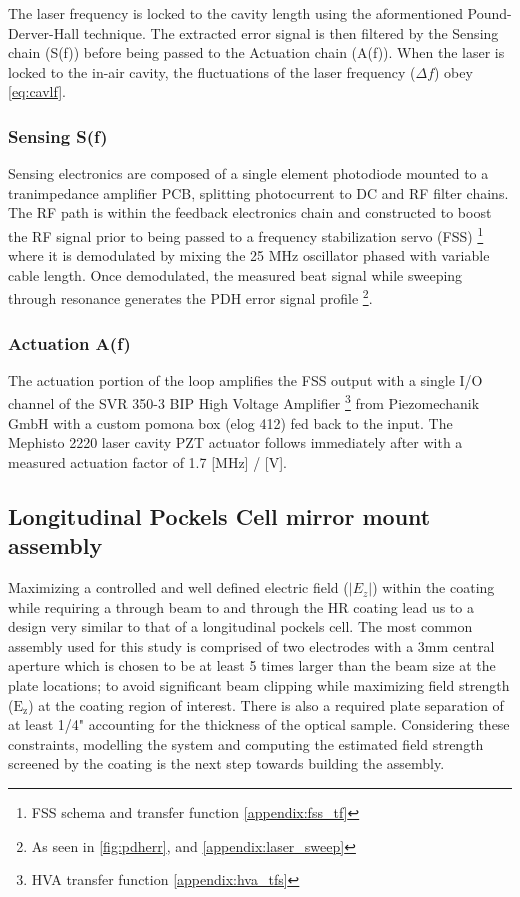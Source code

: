 The laser frequency is locked to the cavity length using the aformentioned Pound-Derver-Hall technique. The extracted error signal is then filtered by the Sensing chain (S(f)) before being passed to the Actuation chain (A(f)). When the laser is locked to the in-air cavity, the fluctuations of the laser frequency ($\Delta f$) obey \autoref{eq:cavlf}. 

\subsubsection{Sensing S(f)}
Sensing electronics are composed of a single element photodiode mounted to a tranimpedance amplifier PCB, splitting photocurrent to DC and RF filter chains. The RF path is within the feedback electronics chain and constructed to boost the RF signal prior to being passed to a frequency stabilization servo (FSS) \footnote{FSS schema and transfer function \autoref{appendix:fss_tf}} where it is demodulated by mixing the 25 MHz oscillator phased with variable cable length. Once demodulated, the measured beat signal while sweeping through resonance generates the PDH error signal profile \footnote{As seen in \autoref{fig:pdherr}, and \autoref{appendix:laser_sweep}}.

\subsubsection{Actuation A(f)}
The actuation portion of the loop amplifies the FSS output with a single I/O channel of the SVR 350-3 BIP High Voltage Amplifier \footnote{HVA transfer function \autoref{appendix:hva_tfs}} from Piezomechanik GmbH with a custom pomona box (elog 412) fed back to the input. The Mephisto 2220 laser cavity PZT actuator follows immediately after with a measured actuation factor of 1.7 [MHz] / [V].

\subsection{Longitudinal Pockels Cell mirror mount assembly}
Maximizing a controlled and well defined electric field ($|E_z|$) within the coating while requiring a through beam to and through the HR coating lead us to a design very similar to that of a longitudinal pockels cell. The most common assembly used for this study is comprised of two electrodes with a 3mm central aperture which is chosen to be at least 5 times larger than the beam size at the plate locations; to avoid significant beam clipping while maximizing field strength ($\mathrm{E}_\mathrm{z}$) at the coating region of interest. There is also a required plate separation of at least 1/4" accounting for the thickness of the optical sample. Considering these constraints, modelling the system and computing the estimated field strength screened by the coating is the next step towards building the assembly.

